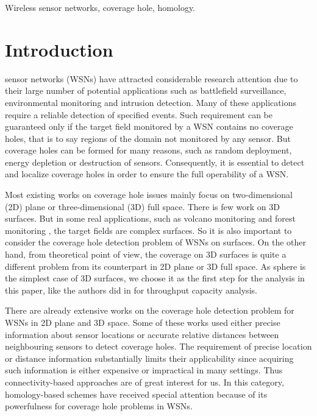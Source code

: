 \documentclass[journal, twoside]{IEEEtran}
\begin{document}
\begin{IEEEkeywords}
Wireless sensor networks, coverage hole, homology.
\end{IEEEkeywords}






\IEEEpeerreviewmaketitle



\section{Introduction}
 sensor networks (WSNs) have attracted considerable
research attention due to their large number of potential applications such as
battlefield surveillance, environmental monitoring and intrusion
detection. Many of these applications require a reliable detection of
specified events. Such requirement can be guaranteed only if the
target field monitored by a WSN contains no coverage holes, that is to
say regions of the domain not monitored by any sensor. But coverage holes
can be formed for many reasons, such as random deployment, energy
depletion or destruction of sensors. Consequently, it is essential to
detect and localize coverage holes in order to ensure the full
operability of a WSN.

Most existing works on coverage hole issues mainly focus on 
two-dimensional (2D) plane or three-dimensional (3D) full space.
There is few work on 3D surfaces. But in some real applications, such as 
volcano monitoring \cite{WLW06} and forest monitoring \cite{MHL09},
the target fields are complex surfaces. So it is also important to consider
the coverage hole detection problem of WSNs on surfaces. On the other hand, 
from theoretical point of view, the coverage on 3D surfaces is quite a 
different problem from its counterpart in 2D plane or
3D full space. As sphere is the simplest case of 3D surfaces, we choose it
as the first step for the analysis in this paper, like the authors 
did in \cite{GK00} for throughput capacity analysis.

There are already extensive works on the coverage hole detection problem for WSNs in 
2D plane and 3D space. Some of these works used either precise information 
about sensor locations \cite{FGG04, WCL04, ZZF09, HT03, HTL04} or accurate 
relative distances between neighbouring sensors \cite{B08, B12} to detect 
coverage holes. The requirement of precise location or distance information
substantially limits their applicability since acquiring such information
is either expensive or impractical in many settings. Thus connectivity-based
approaches are of great interest for us. In this category, homology-based
schemes have received special attention because of its powerfulness for
coverage hole problems in WSNs. 
\end{document}
